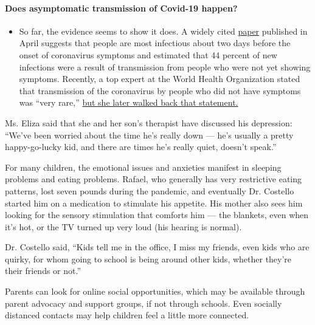 \begin{itemize}
{  \paragraph{Does asymptomatic transmission of Covid-19
  happen?}\label{does-asymptomatic-transmission-of-covid-19-happen}}

  \begin{itemize}
  \tightlist
  \item
    So far, the evidence seems to show it does. A widely cited
    \href{https://www.nature.com/articles/s41591-020-0869-5}{paper}
    published in April suggests that people are most infectious about
    two days before the onset of coronavirus symptoms and estimated that
    44 percent of new infections were a result of transmission from
    people who were not yet showing symptoms. Recently, a top expert at
    the World Health Organization stated that transmission of the
    coronavirus by people who did not have symptoms was ``very rare,''
    \href{https://www.nytimes.com/2020/06/09/world/coronavirus-updates.html?action=click\&pgtype=Article\&state=default\&region=MAIN_CONTENT_3\&context=storylines_faq\#link-1f302e21}{but
    she later walked back that statement.}
  \end{itemize}
\end{itemize}

Ms. Eliza said that she and her son's therapist have discussed his
depression: ``We've been worried about the time he's really down ---
he's usually a pretty happy-go-lucky kid, and there are times he's
really quiet, doesn't speak.''

For many children, the emotional issues and anxieties manifest in
sleeping problems and eating problems. Rafael, who generally has very
restrictive eating patterns, lost seven pounds during the pandemic, and
eventually Dr. Costello started him on a medication to stimulate his
appetite. His mother also sees him looking for the sensory stimulation
that comforts him --- the blankets, even when it's hot, or the TV turned
up very loud (his hearing is normal).

Dr. Costello said, ``Kids tell me in the office, I miss my friends, even
kids who are quirky, for whom going to school is being around other
kids, whether they're their friends or not.''

Parents can look for online social opportunities, which may be available
through parent advocacy and support groups, if not through schools. Even
socially distanced contacts may help children feel a little more
connected.


